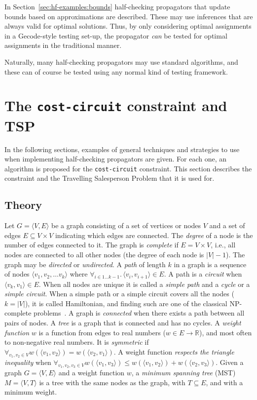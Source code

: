 \documentclass[runningheads]{llncs}
\newcommand{\cons}[1]{\texttt{#1}}
\begin{document}
In Section~\ref{sec:hf-examples:bounds} half-checking propagators that
update bounds based on approximations are described. These may use
inferences that are always valid for optimal solutions. Thus, by only
considering optimal assignments in a Gecode-style testing set-up, the
propagator \emph{can} be tested for optimal assignments in the
traditional manner.

Naturally, many half-checking propagators may use standard
algorithms, and these can of course be tested using any normal kind of
testing framework.


\section{The \cons{cost-circuit} constraint and TSP}
\label{sec:tsp}

In the following sections, examples of general techniques and
strategies to use when implementing half-checking propagators are
given. For each one, an algorithm is proposed for the \cons{cost-circuit}
constraint. This section describes the
constraint and the Travelling Salesperson Problem that it is used for.

\subsection{Theory}
\label{sec:tsp-theory}

Let $G=\langle V,E \rangle$ be a graph consisting of a set of vertices
or nodes $V$ and a set of edges $E\subseteq V\times V$ indicating
which edges are connected. The \emph{degree} of a node is the number
of edges connected to it. The graph is \emph{complete} if
$E= V\times V$, i.e., all nodes are connected to all other nodes (the
degree of each node is $|V|-1$). The
graph may be \emph{directed} or \emph{undirected}. A \emph{path} of
length $k$ in a graph is a sequence of nodes
$\langle v_1, v_2, \ldots v_k \rangle$ where
$\forall_{i\in 1\ldots k-1}.\, \langle v_i,v_{i+1}\rangle\in E$. A path is
a \emph{circuit} when $\langle v_k,v_1\rangle\in E$. When all nodes
are unique it is called a \emph{simple path} and a \emph{cycle} or a
\emph{simple circuit}. When a simple path or a simple circuit covers
all the nodes ($k=|V|$), it is called Hamiltonian, and finding such
 are one of the classical NP-complete problems~\cite{Karp1972}. A
graph is \emph{connected} when there exists a path between all pairs
of nodes. A \emph{tree} is a graph that is connected and has no
cycles.  A \emph{weight function} $w$ is a function from edges to real
numbers ($w\in E\to \mathbb{R}$), and most often to non-negative real
numbers. It is \emph{symmetric} if
$\forall_{v_1,v_2\in V} w(\langle v_1,v_2\rangle) = w(\langle
v_2,v_1\rangle)$. A weight function \emph{respects the triangle
  inequality} when
$\forall_{v_1,v_2,v_3\in V} w(\langle v_1,v_3\rangle )\leq w(\langle
v_1,v_2\rangle ) + w(\langle v_2,v_3\rangle )$. Given a graph
$G=\langle V, E\rangle$ and a weight function $w$, a \emph{minimum spanning
tree} (MST) $M=\langle V, T\rangle$ is a tree with the same nodes as the
graph, with $T\subseteq E$, and with a minimum weight.
\end{document}
